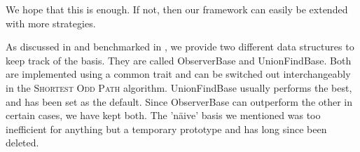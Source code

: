 We hope that this is enough. If not, then our framework can easily be extended with more strategies.

As discussed in  and benchmarked in , we provide two different data structures to keep track of the basis. They are called ObserverBase and UnionFindBase. Both are implemented using a common trait and can be switched out interchangeably in the \textsc{Shortest Odd Path} algorithm. UnionFindBase usually performs the best, and has been set as the default. Since ObserverBase can outperform the other in certain cases, we have kept both. The 'näive' basis we mentioned was too inefficient for anything but a temporary prototype and has long since been deleted.
